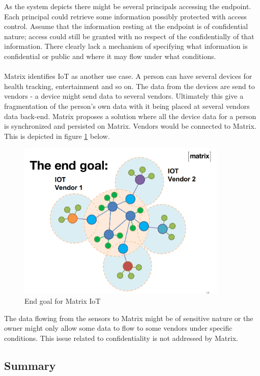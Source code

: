 As the system depicts there might be several principals accessing the endpoint. Each principal could retrieve some information possibly protected with access control. Assume that the information resting at the endpoint is of confidential nature; access could still be granted with no respect of the confidentially of that information. There clearly lack a mechanism of specifying what information is confidential or public and where it may flow under what conditions.  
\\
\\
Matrix identifies IoT as another use case. A person can have several devices for health tracking, entertainment and so on. The data from the devices are send to vendors - a device might send data to several vendors. Ultimately this give a fragmentation of the person's own data with it being placed at several vendors data back-end. Matrix proposes a solution where all the device data for a person is synchronized and persisted on Matrix. Vendors would be connected to Matrix. This is depicted in figure \ref{fig:matrix_iot} below. 

\begin{figure}[H]
	\centering
	\includegraphics[width=10cm]{figures/matrix_iot.png}
	\caption{End goal for Matrix IoT}
	\label{fig:matrix_iot}
\end{figure}

The data flowing from the sensors to Matrix might be of sensitive nature or the owner might only allow some data to flow to some vendors under specific conditions. This issue related to confidentiality is not addressed by Matrix. 

\subsection{Summary}

